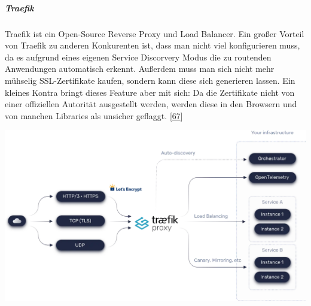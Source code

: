 \documentclass[
    headings=optiontotocandhead,%
    twoside,
    numbers=noenddot,%
    12pt, %
    titlepage, %
    parskip=full, %
    listof=leveldown, 
    numbers=noenddot, %
    a4paper,DIV=14,
    BCOR=15mm,
]{scrbook}
\let\origfigure=\figure
\let\endorigfigure=\endfigure
\renewenvironment{figure}[1][]{%
   \origfigure[H]
}{%
   \endorigfigure
}
\begin{document}
\hypertarget{traefik}{%
\subparagraph{Traefik}\label{traefik}}

Traefik ist ein Open-Source Reverse Proxy und Load Balancer. Ein großer
Vorteil von Traefik zu anderen Konkurenten ist, dass man nicht viel
konfigurieren muss, da es aufgrund eines eigenen Service Discorvery
Modus die zu routenden Anwendungen automatisch erkennt. Außerdem muss
man sich nicht mehr mühselig SSL-Zertifikate kaufen, sondern kann diese
sich generieren lassen. Ein kleines Kontra bringt dieses Feature aber
mit sich: Da die Zertifikate nicht von einer offiziellen Autorität
ausgestellt werden, werden diese in den Browsern und von manchen
Libraries als unsicher geflaggt.
{[}\protect\hyperlink{ref-traefik-overview}{67}{]}

\begin{figure}
\centering
\includegraphics[width=1\textwidth,height=\textheight]{img/Schrempf/traefik-overview.png}
\caption{Traefik Übersicht
{[}\protect\hyperlink{ref-traefik-overview}{67}{]}}
\end{figure}
\end{document}
